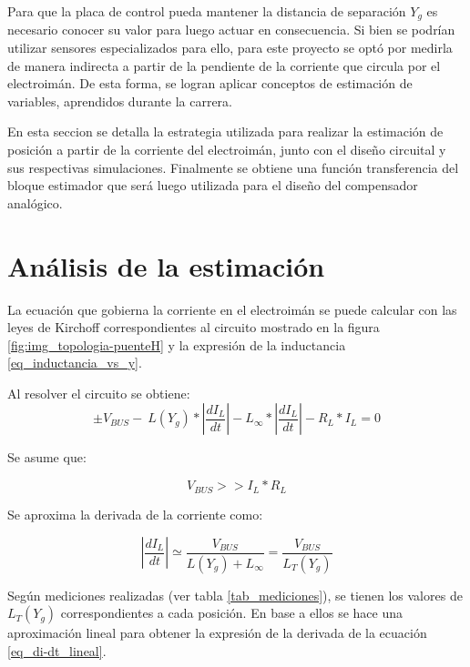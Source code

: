 Para que la placa de control pueda mantener la distancia de separación $Y_{g}$ es necesario conocer su valor  para luego actuar en consecuencia. Si bien se podrían utilizar sensores  especializados para ello, para este proyecto se optó por medirla de manera indirecta a partir de la pendiente de la corriente que circula por el electroimán. De esta forma, se logran aplicar conceptos de estimación de variables, aprendidos durante la carrera. 

En esta seccion se detalla la estrategia utilizada para realizar la estimación de posición a partir de la corriente del electroimán, junto con el diseño circuital y sus respectivas simulaciones. Finalmente se obtiene una función transferencia del bloque estimador que será luego utilizada para el diseño del compensador analógico.

\section{An\'{a}lisis de la estimaci\'{o}n}

La ecuaci\'{o}n que gobierna la corriente en el electroim\'{a}n se puede calcular con las leyes de Kirchoff correspondientes al circuito mostrado en la figura \ref{fig:img_topologia-puenteH} y la expresión de la inductancia \ref{eq_inductancia_vs_y}.


Al resolver el circuito se obtiene:
\begin{equation} \label{eq_VbusCondicion}
	\pm V_{BUS}-\ L(Y_g)*\left|\frac{{dI}_L}{dt}\right|-L_{\infty }*\left|\frac{{dI}_L}{dt}\right|-R_L*I_L=0
\end{equation}

Se asume que:

\begin{equation} \label{eq_Derivadadi-dt}
	V_{BUS}>>I_L*R_L
\end{equation}

\noindent Se aproxima la derivada de la corriente como:

\begin{equation} \label{eq_derivadaAproximacion}
	\left|\frac{{dI}_L}{dt}\right|\simeq \frac{V_{BUS}}{L(Y_g)+L_{\infty }}=\frac{V_{BUS}}{L_T(Y_g)}
\end{equation}

Según mediciones realizadas (ver tabla \ref{tab_mediciones}), se tienen los valores de $L_T(Y_g)$ correspondientes a cada posici\'{o}n. En base a ellos se hace una aproximaci\'{o}n lineal para obtener la expresi\'{o}n de la derivada de la ecuaci\'{o}n \ref{eq_di-dt_lineal}.


